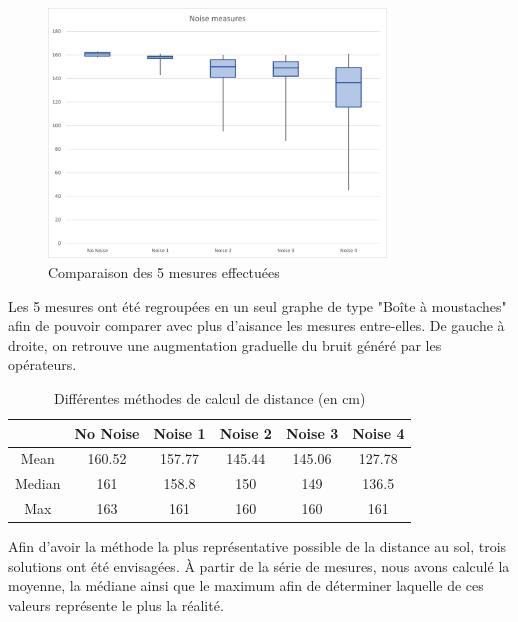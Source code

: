 \begin{figure}[H]
    \centering
    \includegraphics[width=0.8\textwidth]{Images/LiDAR/LiDAR_ErrorMes_Moustache.png}
    \caption{Comparaison des 5 mesures effectuées}
    \label{fig:ErrorMesMoustache}
\end{figure}

Les 5 mesures ont été regroupées en un seul graphe de type "Boîte à moustaches" afin de pouvoir
comparer avec plus d'aisance les mesures entre-elles. De gauche à droite, on retrouve une augmentation
graduelle du bruit généré par les opérateurs.

\begin{table}[H]
    \centering
    \begin{tabular}{|c|c|c|c|c|c|}
        \hline
        & No Noise & Noise 1 & Noise 2 & Noise 3 & Noise 4 \\
        \hline\hline
        Mean & 160.52 & 157.77 & 145.44 & 145.06 & 127.78 \\
        \hline
        Median & 161 & 158.8 & 150 & 149 & 136.5 \\
        \hline
        Max & 163 & 161 & 160 & 160 & 161 \\
        \hline
        
    \end{tabular}
    \caption{Différentes méthodes de calcul de distance (en cm)}
    \label{table:ComputingMethods}
\end{table}

Afin d'avoir la méthode la plus représentative possible de la distance au sol, trois solutions 
ont été envisagées. À partir de la série de mesures, nous avons calculé la moyenne, la médiane
ainsi que le maximum afin de déterminer laquelle de ces valeurs représente le plus la réalité.

